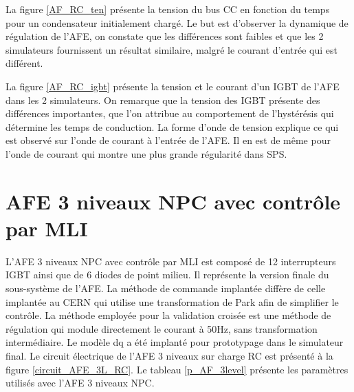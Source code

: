 La figure \ref{AF_RC_ten} présente la tension du bus CC en fonction du temps pour un condensateur initialement chargé. Le but est d'observer la dynamique de régulation de l'AFE, on constate que les différences sont faibles et que les 2 simulateurs fournissent un résultat similaire, malgré le courant d'entrée qui est différent.

La figure \ref{AF_RC_igbt} présente la tension et le courant d'un IGBT de l'AFE dans les 2 simulateurs. On remarque que la tension des IGBT présente des différences importantes, que l'on attribue au comportement de l'hystérésis qui détermine les temps de conduction. La forme d'onde de tension explique ce qui est observé sur l'onde de courant à l'entrée de l'AFE. Il en est de même pour l'onde de courant qui montre une plus grande régularité dans SPS.


\section{AFE 3 niveaux NPC avec contrôle par MLI}
L'AFE 3 niveaux NPC avec contrôle par MLI est composé de 12 interrupteurs IGBT ainsi que de 6 diodes de point milieu. Il représente la version finale du sous-système de l'AFE. La méthode de commande implantée diffère de celle implantée au CERN qui utilise une transformation de Park afin de simplifier le contrôle. La méthode employée pour la validation croisée est une méthode de régulation qui module directement le courant à 50Hz, sans transformation intermédiaire. Le modèle dq a été implanté pour prototypage dans le simulateur final. Le circuit électrique de l'AFE 3 niveaux sur charge RC est présenté à la figure \ref{circuit_AFE_3L_RC}. Le tableau \ref{p_AF_3level} présente les paramètres utilisés avec l'AFE 3 niveaux NPC.


